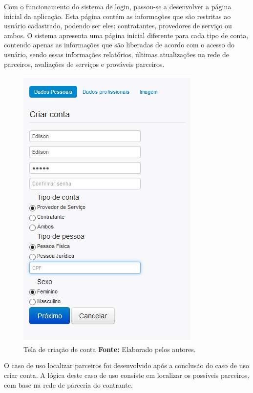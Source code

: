 \newpage

\par Com o funcionamento do sistema de login, passou-se a desenvolver a página inicial da aplicação. Esta página contém as informações que são restritas ao usuário cadastrado, podendo ser eles: contratantes, provedores de serviço ou ambos. O sistema apresenta uma página inicial diferente para cada tipo de conta, contendo apenas as informações que são liberadas de acordo com o acesso do usuário, sendo essas informações relatórios, últimas atualizações na rede de parceiros, avaliações de serviços e prováveis parceiros.

\begin{figure}[h!]
	\centerline{\includegraphics[scale=0.60]{./imagens/novaconta1.jpg}}
	\caption[Tela de criação de conta ]
	{Tela de criação de conta \textbf{Fonte:} Elaborado pelos autores.}
	\label{fig:exemplo1}
\end{figure}

\newpage

\par O caso de uso localizar parceiros foi desenvolvido após a conclusão do caso de uso criar conta. A lógica deste caso de uso consiste em localizar os possíveis parceiros, com base na rede de parceria do contrante.

